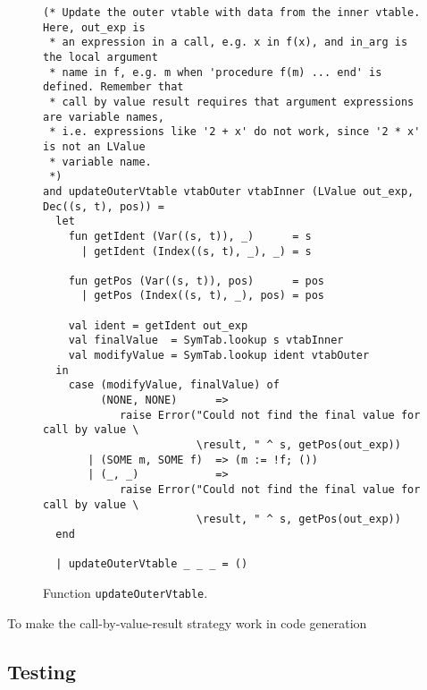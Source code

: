 \begin{figure}[H]
  \begin{lstlisting}[style=MLStyle]
(* Update the outer vtable with data from the inner vtable. Here, out_exp is
 * an expression in a call, e.g. x in f(x), and in_arg is the local argument
 * name in f, e.g. m when 'procedure f(m) ... end' is defined. Remember that
 * call by value result requires that argument expressions are variable names,
 * i.e. expressions like '2 + x' do not work, since '2 * x' is not an LValue
 * variable name.
 *)
and updateOuterVtable vtabOuter vtabInner (LValue out_exp, Dec((s, t), pos)) = 
  let
    fun getIdent (Var((s, t)), _)      = s
      | getIdent (Index((s, t), _), _) = s
    
    fun getPos (Var((s, t)), pos)      = pos
      | getPos (Index((s, t), _), pos) = pos

    val ident = getIdent out_exp
    val finalValue  = SymTab.lookup s vtabInner
    val modifyValue = SymTab.lookup ident vtabOuter
  in
    case (modifyValue, finalValue) of
         (NONE, NONE)      =>
            raise Error("Could not find the final value for call by value \
                        \result, " ^ s, getPos(out_exp))
       | (SOME m, SOME f)  => (m := !f; ())
       | (_, _)            =>
            raise Error("Could not find the final value for call by value \
                        \result, " ^ s, getPos(out_exp))
  end

  | updateOuterVtable _ _ _ = ()
  \end{lstlisting}
  \caption{Function \texttt{updateOuterVtable}.}
  \label{fig_updateOuterVtable}
\end{figure}

\noindent
To make the call-by-value-result strategy work in code generation

\subsection{Testing}
